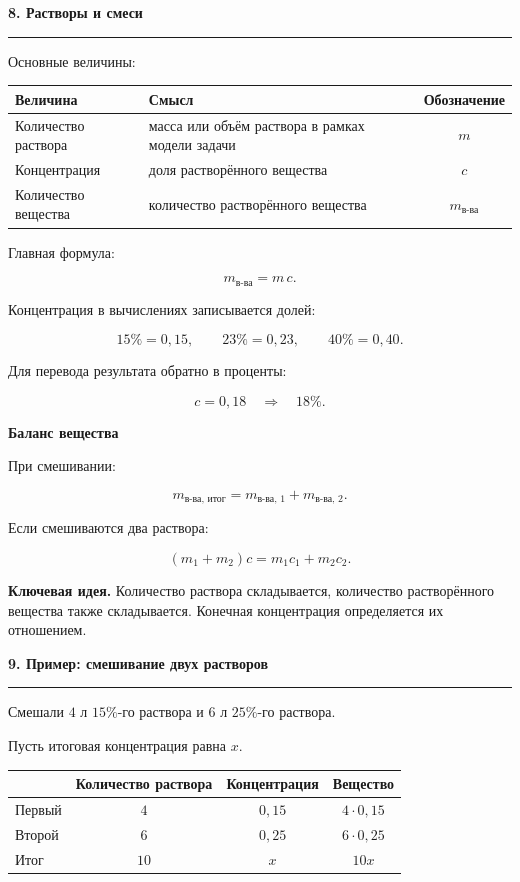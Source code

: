 \documentclass[a4paper,12pt]{article}
\newcommand{\topic}[1]{%
    \vspace{0.5em}
    {\Large\bfseries\color{darkaccent}#1}\par
    \vspace{0.25em}
    {\color{accent!55}\rule{\linewidth}{0.6pt}}\par
    \vspace{0.45em}
}
\newcommand{\subtopic}[1]{%
    \vspace{0.4em}
    {\large\bfseries\color{darkaccent}#1}\par
    \vspace{0.15em}
}
\newcommand{\keyidea}[1]{%
    \textbf{\color{darkaccent}Ключевая идея.} #1
}
\begin{document}
\topic{8. Растворы и смеси}

Основные величины:

\begin{center}
\renewcommand{\arraystretch}{1.35}
\begin{tabularx}{0.9\linewidth}{@{} l X c @{}}
\toprule
\textbf{Величина} & \textbf{Смысл} & \textbf{Обозначение} \\
\midrule
Количество раствора & масса или объём раствора в рамках модели задачи & $m$ \\
Концентрация & доля растворённого вещества & $c$ \\
Количество вещества & количество растворённого вещества & $m_{\text{в-ва}}$ \\
\bottomrule
\end{tabularx}
\end{center}

Главная формула:

\[
\boxed{
m_{\text{в-ва}}=m\,c
}.
\]

Концентрация в вычислениях записывается долей:

\[
15\%=0{,}15,
\qquad
23\%=0{,}23,
\qquad
40\%=0{,}40.
\]

Для перевода результата обратно в проценты:

\[
c=0{,}18
\quad\Longrightarrow\quad
18\%.
\]

\subtopic{Баланс вещества}

При смешивании:

\[
\boxed{
m_{\text{в-ва, итог}}
=
m_{\text{в-ва, 1}}
+
m_{\text{в-ва, 2}}
}.
\]

Если смешиваются два раствора:

\[
\boxed{
(m_1+m_2)c
=
m_1c_1+m_2c_2
}.
\]

\keyidea{Количество раствора складывается, количество растворённого вещества также складывается. Конечная концентрация определяется их отношением.}


\topic{9. Пример: смешивание двух растворов}

Смешали $4$ л $15\%$-го раствора и $6$ л $25\%$-го раствора.

Пусть итоговая концентрация равна $x$.

\begin{center}
\renewcommand{\arraystretch}{1.35}
\begin{tabularx}{0.84\linewidth}{@{} X c c c @{}}
\toprule
& \textbf{Количество раствора} & \textbf{Концентрация} & \textbf{Вещество} \\
\midrule
Первый & $4$ & $0{,}15$ & $4\cdot0{,}15$ \\
Второй & $6$ & $0{,}25$ & $6\cdot0{,}25$ \\
Итог & $10$ & $x$ & $10x$ \\
\bottomrule
\end{tabularx}
\end{center}
\end{document}
